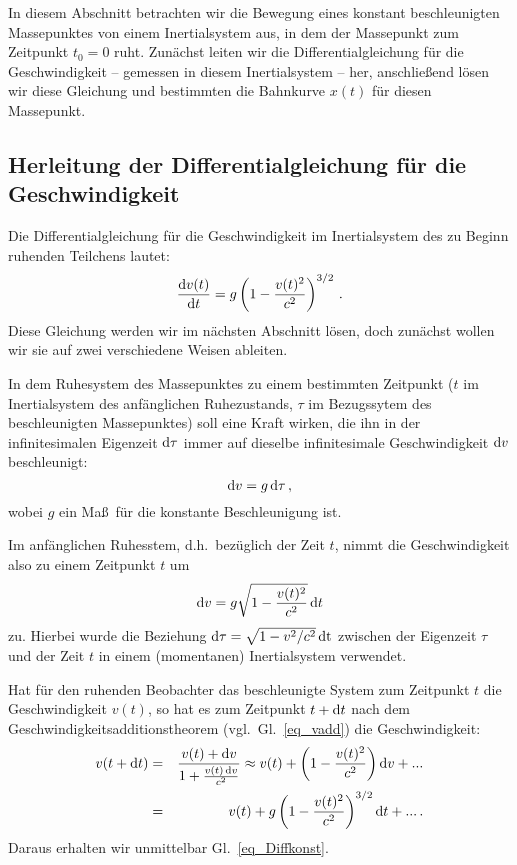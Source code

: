 In diesem Abschnitt betrachten wir die Bewegung eines 
konstant beschleunigten Massepunktes von einem
Inertialsystem aus, in dem
der Massepunkt zum Zeitpunkt $t_0=0$
ruht. Zun\"achst leiten wir die 
Differentialgleichung f\"ur die 
Geschwindigkeit --
gemessen in diesem Inertialsystem -- 
her, anschlie\ss end l\"osen wir
diese Gleichung und bestimmten die
Bahnkurve $x(t)$ f\"ur diesen Massepunkt.

\subsection{Herleitung der Differentialgleichung
f\"ur die Geschwindigkeit}

Die Differentialgleichung f\"ur die
Geschwindigkeit im Inertialsystem des zu
Beginn ruhenden Teilchens lautet:
\begin{equation}
\label{eq_Diffkonst}
      \frac{{\rm d}v(t)}{{\rm d}t} =
          g \left( 1 - \frac{v(t)^2}{c^2} \right)^{3/2} \, .
\end{equation}
Diese Gleichung werden wir im n\"achsten
Abschnitt l\"osen, doch zun\"achst wollen wir
sie auf zwei verschiedene Weisen ableiten.

In dem Ruhesystem des Massepunktes
zu einem bestimmten Zeitpunkt ($t$ im
Inertialsystem des anf\"anglichen Ruhezustands,
$\tau$ im Bezugssytem des beschleunigten
Massepunktes) soll
eine Kraft wirken, die ihn in der infinitesimalen
Eigenzeit ${\rm d}\tau$ immer auf dieselbe 
infinitesimale Geschwindigkeit ${\rm d}v$ 
beschleunigt:
\begin{equation}
          {\rm d} v = g \, {\rm d} \tau  \, ,
\end{equation}
wobei $g$ ein Ma\ss\ f\"ur die konstante
Beschleunigung ist. 

Im anf\"anglichen Ruhesstem, d.h.\ bez\"uglich
der Zeit $t$, nimmt die Geschwindigkeit also
zu einem Zeitpunkt $t$ um
\begin{equation}
      {\rm d} v = g \sqrt{1 - \frac{v(t)^2}{c^2} } \,  {\rm d}t
\end{equation}
zu. Hierbei wurde die Beziehung ${\rm d}\tau = \sqrt{1-v^2/c^2}\,{\rm dt}$
zwischen der Eigenzeit $\tau$ und der Zeit $t$ in einem (momentanen)
Inertialsystem verwendet. 

Hat f\"ur den ruhenden Beobachter das beschleunigte
System zum Zeitpunkt $t$ die Geschwindigkeit $v(t)$,
so hat es zum Zeitpunkt $t+ {\rm d}t$ nach dem
Geschwindigkeitsadditionstheorem
(vgl.\ Gl.\ \ref{eq_vadd}) die Geschwindigkeit:
\begin{eqnarray}
   v(t+{\rm d}t) &=& \frac{v(t) + {\rm d}v}{1 + \frac{v(t) \, {\rm d}v}{c^2}}
    \approx v(t) + \left( 1 - \frac{v(t)^2}{c^2} \right) {\rm d} v +
    ... \\\
    & = & v(t) + g \left( 1 - \frac{v(t)^2}{c^2} \right)^{3/2} {\rm d} t + ...  \, .
\end{eqnarray}
Daraus erhalten wir unmittelbar Gl.\ \ref{eq_Diffkonst}.

